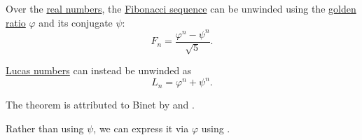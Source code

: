 \begin{theorem}\label{thm:binets_fibonacci_number_formula}
  Over the \hyperref[def:real_numbers]{real numbers}, the \hyperref[def:fibonacci_numbers]{Fibonacci sequence} can be unwinded using the \hyperref[def:golden_ratio]{golden ratio} \( \varphi \) and its conjugate \( \psi \):
  \begin{equation}\label{eq:thm:binets_formula/fibonacci}
    F_n = \frac {\varphi^n - \psi^n} {\sqrt 5}.
  \end{equation}

  \hyperref[def:lucas_numbers]{Lucas numbers} can instead be unwinded as
  \begin{equation}\label{eq:thm:binets_formula/lucas}
    L_n = \varphi^n + \psi^n.
  \end{equation}
\end{theorem}
\begin{comments}
  \item The theorem is attributed to Binet by  and .
  \item Rather than using \( \psi \), we can express it via \( \varphi \) using .
\end{comments}
